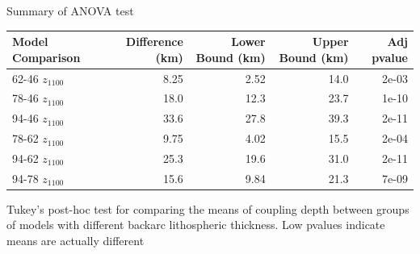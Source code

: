 \documentclass[draft]{agujournal2019}
\begin{document}
\begin{threeparttable}[H]
 \caption{Summary of ANOVA test}
 \label{TableS1}
 \setlength{\tabcolsep}{4pt}
 \begin{tabularx}{\textwidth}{L{1} R{1} R{1} R{1} R{1}}

  \toprule

  Model Comparison & Difference (km) & Lower Bound (km) & Upper Bound (km) & Adj pvalue \\

  \midrule

  62-46 $z_{1100}$ & 8.25            & 2.52             & 14.0             & 2e-03      \\
  78-46 $z_{1100}$ & 18.0            & 12.3             & 23.7             & 1e-10      \\
  94-46 $z_{1100}$ & 33.6            & 27.8             & 39.3             & 2e-11      \\
  78-62 $z_{1100}$ & 9.75            & 4.02             & 15.5             & 2e-04      \\
  94-62 $z_{1100}$ & 25.3            & 19.6             & 31.0             & 2e-11      \\
  94-78 $z_{1100}$ & 15.6            & 9.84             & 21.3             & 7e-09      \\

  \bottomrule
 \end{tabularx}
 \begin{tablenotes}
  \footnotesize
  \item Tukey's post-hoc test for comparing the means of coupling depth between groups
  of models with different backarc lithospheric thickness. Low pvalues indicate means
  are actually different
 \end{tablenotes}
\end{threeparttable}
\end{document}
